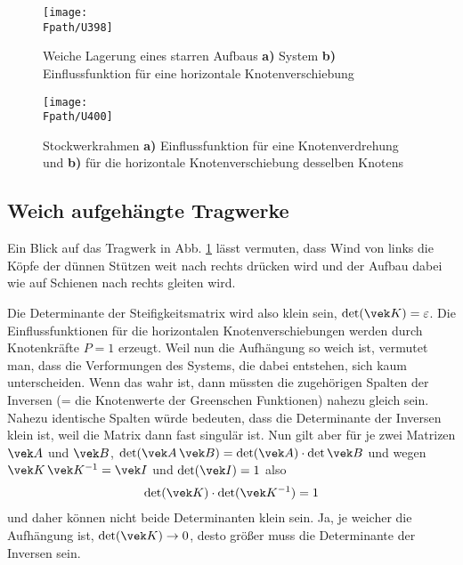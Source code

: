 {{%
\begin{figure}
\centering
\if {} \sidecaption \fi
\texttt{[image: \\Fpath/U398]}
\caption{Weiche Lagerung eines starren Aufbaus \textbf{ a)} System \textbf{ b)} Einflussfunktion f\"{u}r eine horizontale Knotenverschiebung}
\label{U398}%
\end{figure}%

\begin{figure}
\centering
\if {} \sidecaption \fi
\texttt{[image: \\Fpath/U400]}
\caption{Stockwerkrahmen \textbf{ a)} Einflussfunktion f\"{u}r eine Knotenverdrehung und \textbf{ b)} f\"{u}r die horizontale Knotenverschiebung desselben Knotens}
\label{U400}%
\end{figure}%

{\textcolor{blau2}{\section{Weich aufgeh\"{a}ngte Tragwerke}}}\label{Korrektur10}
Ein Blick auf das Tragwerk in Abb. \ref{U398} l\"{a}sst vermuten, dass Wind von links die K\"{o}pfe der d\"{u}nnen St\"{u}tzen weit nach rechts dr\"{u}cken wird und der Aufbau dabei wie auf Schienen nach rechts gleiten wird.

Die Determinante der Steifigkeitsmatrix wird also klein sein, $\det(\vek K) = \varepsilon$. Die Einflussfunktionen f\"{u}r die horizontalen Knotenverschiebungen werden durch Knotenkr\"{a}fte $P = 1$ erzeugt. Weil nun die Aufh\"{a}ngung so weich ist, vermutet man, dass die Verformungen des Systems, die dabei entstehen, sich kaum unterscheiden. Wenn das wahr ist, dann m\"{u}ssten die zugeh\"{o}rigen Spalten der Inversen (= die Knotenwerte der Greenschen Funktionen) nahezu gleich sein. Nahezu identische Spalten w\"{u}rde bedeuten, dass die Determinante der Inversen klein ist, weil die Matrix dann fast singul\"{a}r ist. Nun gilt aber f\"{u}r je zwei Matrizen $\vek A$ und $\vek B$, $\det(\vek A\,\vek B) = \det(\vek A) \cdot \det \vek B$ und wegen $\vek K\,\vek K^{-1} = \vek I$ und $\det(\vek I) = 1$ also
\begin{align}
\det(\vek K) \cdot \det(\vek K^{-1}) = 1
\end{align}
und daher k\"{o}nnen nicht beide Determinanten klein sein. Ja, je weicher die Aufh\"{a}ngung ist, $\det(\vek K) \to 0$, desto gr\"{o}{\ss}er muss die Determinante der Inversen sein.

}}
